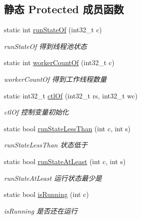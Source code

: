 \subsection*{静态 Protected 成员函数}
\begin{DoxyCompactItemize}
\item 
static int \hyperlink{classThreadPoolExecutor_aa7ca2a35d562746df0d77bd043bb75f0}{run\+State\+Of} (int32\+\_\+t c)
\begin{DoxyCompactList}\small\item\em run\+State\+Of 得到线程池状态 \end{DoxyCompactList}\item 
static int \hyperlink{classThreadPoolExecutor_af00080b50ff18ef719078b14b3df7291}{worker\+Count\+Of} (int32\+\_\+t c)
\begin{DoxyCompactList}\small\item\em worker\+Count\+Of 得到工作线程数量 \end{DoxyCompactList}\item 
static int32\+\_\+t \hyperlink{classThreadPoolExecutor_a73773038a4cce87d62e1c7715670aee7}{ctl\+Of} (int32\+\_\+t rs, int32\+\_\+t wc)
\begin{DoxyCompactList}\small\item\em ctl\+Of 控制变量初始化 \end{DoxyCompactList}\item 
static bool \hyperlink{classThreadPoolExecutor_a697d1afa93650fe597228fd5fb7b725b}{run\+State\+Less\+Than} (int c, int s)
\begin{DoxyCompactList}\small\item\em run\+State\+Less\+Than 状态低于 \end{DoxyCompactList}\item 
static bool \hyperlink{classThreadPoolExecutor_a5c20cff76deba933ace0f5a9f19ed5fd}{run\+State\+At\+Least} (int c, int s)
\begin{DoxyCompactList}\small\item\em run\+State\+At\+Least 运行状态最少是 \end{DoxyCompactList}\item 
static bool \hyperlink{classThreadPoolExecutor_a6a08024efe3dd52349a4c3cc3e816223}{is\+Running} (int c)
\begin{DoxyCompactList}\small\item\em is\+Running 是否还在运行 \end{DoxyCompactList}\end{DoxyCompactItemize}


